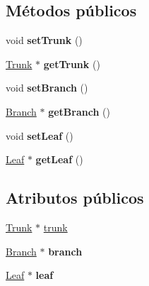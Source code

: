 \subsection*{Métodos públicos}
\begin{DoxyCompactItemize}
\item 
\mbox{\label{class_basic_tree_a195c3f52d1d808d558657c200423a9f7}} 
void {\bfseries set\+Trunk} ()
\item 
\mbox{\label{class_basic_tree_ae2071a8f7b8eb677032ef22d0943da33}} 
\mbox{\hyperlink{class_trunk}{Trunk}} $\ast$ {\bfseries get\+Trunk} ()
\item 
\mbox{\label{class_basic_tree_acd2eb120901e13f87cc30526464edac3}} 
void {\bfseries set\+Branch} ()
\item 
\mbox{\label{class_basic_tree_aeb2d743d8c5cad3c1ffdda0671447b3e}} 
\mbox{\hyperlink{class_branch}{Branch}} $\ast$ {\bfseries get\+Branch} ()
\item 
\mbox{\label{class_basic_tree_a2d34981cfa0c29fa7848cfa83478b512}} 
void {\bfseries set\+Leaf} ()
\item 
\mbox{\label{class_basic_tree_ac7f05f760caf9e3ba9c0c07c7e16d2eb}} 
\mbox{\hyperlink{class_leaf}{Leaf}} $\ast$ {\bfseries get\+Leaf} ()
\end{DoxyCompactItemize}
\subsection*{Atributos públicos}
\begin{DoxyCompactItemize}
\item 
\mbox{\hyperlink{class_trunk}{Trunk}} $\ast$ \mbox{\hyperlink{class_basic_tree_ace2c7d40cde2b75633b634bfee0818d5}{trunk}}
\item 
\mbox{\label{class_basic_tree_a329685c53fd6e5e27d58df683e0ad486}} 
\mbox{\hyperlink{class_branch}{Branch}} $\ast$ {\bfseries branch}
\item 
\mbox{\label{class_basic_tree_a396fcfd963f9f5f845a2ca661ce020f7}} 
\mbox{\hyperlink{class_leaf}{Leaf}} $\ast$ {\bfseries leaf}
\end{DoxyCompactItemize}


